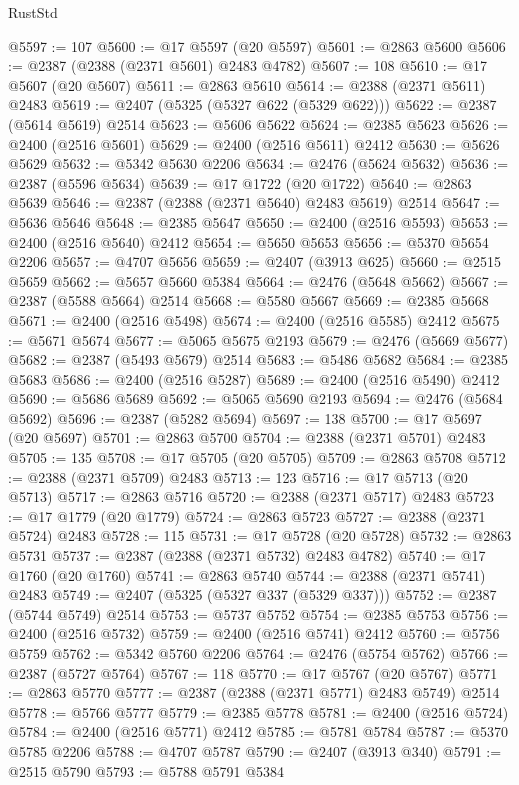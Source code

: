 \begin{lexlean}{RustStd}
\begin{coremodule}
@5597 := 107
@5600 := @17 @5597 (@20 @5597)
@5601 := @2863 @5600
@5606 := @2387 (@2388 (@2371 @5601) @2483 @4782)
@5607 := 108
@5610 := @17 @5607 (@20 @5607)
@5611 := @2863 @5610
@5614 := @2388 (@2371 @5611) @2483
@5619 := @2407 (@5325 (@5327 @622 (@5329 @622)))
@5622 := @2387 (@5614 @5619) @2514
@5623 := @5606 @5622
@5624 := @2385 @5623
@5626 := @2400 (@2516 @5601)
@5629 := @2400 (@2516 @5611) @2412
@5630 := @5626 @5629
@5632 := @5342 @5630 @2206
@5634 := @2476 (@5624 @5632)
@5636 := @2387 (@5596 @5634)
@5639 := @17 @1722 (@20 @1722)
@5640 := @2863 @5639
@5646 := @2387 (@2388 (@2371 @5640) @2483 @5619) @2514
@5647 := @5636 @5646
@5648 := @2385 @5647
@5650 := @2400 (@2516 @5593)
@5653 := @2400 (@2516 @5640) @2412
@5654 := @5650 @5653
@5656 := @5370 @5654 @2206
@5657 := @4707 @5656
@5659 := @2407 (@3913 @625)
@5660 := @2515 @5659
@5662 := @5657 @5660 @5384
@5664 := @2476 (@5648 @5662)
@5667 := @2387 (@5588 @5664) @2514
@5668 := @5580 @5667
@5669 := @2385 @5668
@5671 := @2400 (@2516 @5498)
@5674 := @2400 (@2516 @5585) @2412
@5675 := @5671 @5674
@5677 := @5065 @5675 @2193
@5679 := @2476 (@5669 @5677)
@5682 := @2387 (@5493 @5679) @2514
@5683 := @5486 @5682
@5684 := @2385 @5683
@5686 := @2400 (@2516 @5287)
@5689 := @2400 (@2516 @5490) @2412
@5690 := @5686 @5689
@5692 := @5065 @5690 @2193
@5694 := @2476 (@5684 @5692)
@5696 := @2387 (@5282 @5694)
@5697 := 138
@5700 := @17 @5697 (@20 @5697)
@5701 := @2863 @5700
@5704 := @2388 (@2371 @5701) @2483
@5705 := 135
@5708 := @17 @5705 (@20 @5705)
@5709 := @2863 @5708
@5712 := @2388 (@2371 @5709) @2483
@5713 := 123
@5716 := @17 @5713 (@20 @5713)
@5717 := @2863 @5716
@5720 := @2388 (@2371 @5717) @2483
@5723 := @17 @1779 (@20 @1779)
@5724 := @2863 @5723
@5727 := @2388 (@2371 @5724) @2483
@5728 := 115
@5731 := @17 @5728 (@20 @5728)
@5732 := @2863 @5731
@5737 := @2387 (@2388 (@2371 @5732) @2483 @4782)
@5740 := @17 @1760 (@20 @1760)
@5741 := @2863 @5740
@5744 := @2388 (@2371 @5741) @2483
@5749 := @2407 (@5325 (@5327 @337 (@5329 @337)))
@5752 := @2387 (@5744 @5749) @2514
@5753 := @5737 @5752
@5754 := @2385 @5753
@5756 := @2400 (@2516 @5732)
@5759 := @2400 (@2516 @5741) @2412
@5760 := @5756 @5759
@5762 := @5342 @5760 @2206
@5764 := @2476 (@5754 @5762)
@5766 := @2387 (@5727 @5764)
@5767 := 118
@5770 := @17 @5767 (@20 @5767)
@5771 := @2863 @5770
@5777 := @2387 (@2388 (@2371 @5771) @2483 @5749) @2514
@5778 := @5766 @5777
@5779 := @2385 @5778
@5781 := @2400 (@2516 @5724)
@5784 := @2400 (@2516 @5771) @2412
@5785 := @5781 @5784
@5787 := @5370 @5785 @2206
@5788 := @4707 @5787
@5790 := @2407 (@3913 @340)
@5791 := @2515 @5790
@5793 := @5788 @5791 @5384

\end{coremodule}
\end{lexlean}

